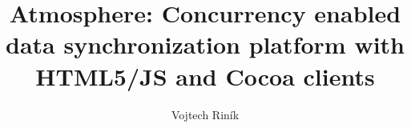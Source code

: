 \documentclass[]{tukethesis}
\author{Vojtech Riník}
\title{Atmosphere: Concurrency enabled data synchronization platform with HTML5/JS and Cocoa clients}
\subtitle{}
\begin{document}
\renewcommand\theHfigure{\theHsection.\arabic{figure}}
\renewcommand\theHtable{\theHsection.\arabic{table}}

\firstpage

\titlepage


\setlength{\parindent}{1cm} 
\setlength{\parskip}{0cm}

%
%

%
%
\end{document}
